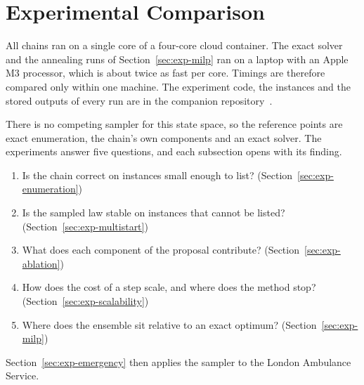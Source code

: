 \documentclass[11pt]{article}
\theoremstyle{definition}
\begin{document}

\section{Experimental Comparison}\label{sec:experiments}\label{sec:setup}

All chains ran on a single core of a four-core cloud container. The exact solver and the annealing runs of Section~\ref{sec:exp-milp} ran on a laptop with an Apple M3 processor, which is about twice as fast per core. Timings are therefore compared only within one machine. The experiment code, the instances and the stored outputs of every run are in the companion repository~\citep{falcomchain}.

There is no competing sampler for this state space, so the reference points are exact enumeration, the chain's own components and an exact solver. The experiments answer five questions, and each subsection opens with its finding.
\begin{enumerate}[label=(Q\arabic*),leftmargin=3em,itemsep=1pt,topsep=3pt]
\item Is the chain correct on instances small enough to list? (Section~\ref{sec:exp-enumeration})
\item Is the sampled law stable on instances that cannot be listed? (Section~\ref{sec:exp-multistart})
\item What does each component of the proposal contribute? (Section~\ref{sec:exp-ablation})
\item How does the cost of a step scale, and where does the method stop? (Section~\ref{sec:exp-scalability})
\item Where does the ensemble sit relative to an exact optimum? (Section~\ref{sec:exp-milp})
\end{enumerate}
Section~\ref{sec:exp-emergency} then applies the sampler to the London Ambulance Service.
\end{document}
